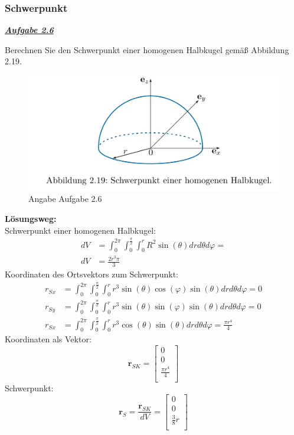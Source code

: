 \documentclass[a4paper,12p]{article}
\begin{document}
\subsubsection{Schwerpunkt}
\begin{flushleft}
	\underline{\textbf{\textit{Aufgabe 2.6}}} \\
\end{flushleft}
Berechnen Sie den Schwerpunkt einer homogenen Halbkugel gemäß Abbildung 2.19. 
\begin{figure}[h]
	\begin{center}
		\includegraphics[width=12.5cm]{pic/Angabe2_6}
		\caption{Angabe Aufgabe 2.6}
		\label{Aufgabe2.6}
	\end{center}
\end{figure} 
\newline
\textbf{Lösungsweg:} \\
Schwerpunkt einer homogenen Halbkugel: \\
\begin{align*}
	dV &= \int_{0}^{2\pi}\int_{0}^{\frac{\pi}{2}}\int_{0}^{r}R^2\sin(\theta)dr d\theta d\varphi = \\
	dV &= \frac{2r^3\pi}{3}
\end{align*}
\newpage
Koordinaten des Ortsvektors zum Schwerpunkt:
\begin{align*}
	r_{Sx} &= \int_{0}^{2\pi}\int_{0}^{\frac{\pi}{2}}\int_{0}^{r}r^3\sin(\theta)\cos(\varphi)\sin(\theta)dr d\theta d\varphi = 0 \\
	r_{Sy} &= \int_{0}^{2\pi}\int_{0}^{\frac{\pi}{2}}\int_{0}^{r}r^3\sin(\theta)\sin(\varphi)\sin(\theta)dr d\theta d\varphi = 0 \\
	r_{Sx} &= \int_{0}^{2\pi}\int_{0}^{\frac{\pi}{2}}\int_{0}^{r}r^3\cos(\theta)\sin(\theta)dr d\theta d\varphi = \frac{\pi r^4}{4}
\end{align*}
Koordinaten als Vektor:
\[
	\textbf{r}_{SK} = 
	\left[
		\begin{array}{c}
			0 \\
			0 \\
		    \frac{\pi r^4}{4} \\
		\end{array}
	\right]
\]
Schwerpunkt:
\[
	\textbf{r}_{S} = \frac{\textbf{r}_{SK}}{dV} = 
	\left[
		\begin{array}{c}
			0 \\
			0 \\
			\frac{3}{8}r \\
		\end{array}
	\right]
\]
\end{document}

